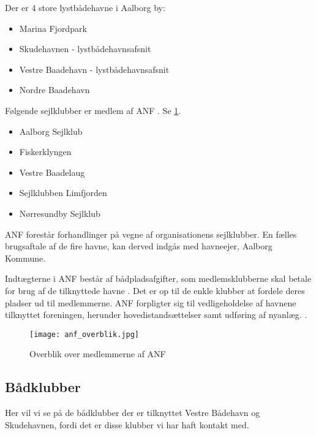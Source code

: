 Der er 4 store lystbådehavne i Aalborg by:
\begin{itemize}[noitemsep]
    \item Marina Fjordpark
    \item Skudehavnen - lystbådehavnsafsnit
    \item Vestre Baadehavn - lystbådehavnsafsnit
    \item Nordre Baadehavn
\end{itemize}



Følgende sejlklubber er medlem af ANF \cite{anf_havnereglement}. Se \cref{fig:anf_overblik}.
\begin{itemize}[noitemsep]
	\item Aalborg Sejlklub
	\item Fiskerklyngen
	\item Vestre Baadelaug
	\item Sejlklubben Limfjorden
	\item Nørresundby Sejlklub
\end{itemize}
 
ANF forestår forhandlinger på vegne af organisationens sejlklubber. En fælles brugsaftale af de fire havne, kan derved indgås med havneejer, Aalborg Kommune.

Indtægterne i ANF består af bådpladsafgifter, som medlemsklubberne skal betale for brug af de tilknyttede havne \cite{anf_budget_2013}. Det er op til de enkle klubber at fordele deres pladser ud til medlemmerne. ANF forpligter sig til vedligeholdelse af havnene tilknyttet foreningen, herunder hovedistandsættelser samt udføring af nyanlæg. \cite{anf_brugsaftale_2012}.


\begin{figure}
  \centering
  \texttt{[image: anf\_overblik.jpg]}
 	\caption{Overblik over medlemmerne af ANF} 	\label{fig:anf_overblik}
\end{figure}



\subsection{Bådklubber}
Her vil vi se på de bådklubber der er tilknyttet Vestre Bådehavn og Skudehavnen, fordi det er disse klubber vi har haft kontakt med.

